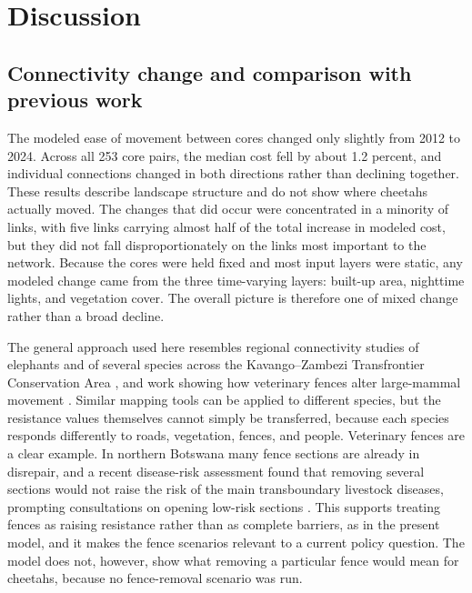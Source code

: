 \section{Discussion}
\label{sec:discussion}

\subsection{Connectivity change and comparison with previous work}

The modeled ease of movement between cores changed only slightly from 2012 to 2024. Across all 253 core pairs, the median cost fell by about 1.2 percent, and individual connections changed in both directions rather than declining together. These results describe landscape structure and do not show where cheetahs actually moved. The changes that did occur were concentrated in a minority of links, with five links carrying almost half of the total increase in modeled cost, but they did not fall disproportionately on the links most important to the network. Because the cores were held fixed and most input layers were static, any modeled change came from the three time-varying layers: built-up area, nighttime lights, and vegetation cover. The overall picture is therefore one of mixed change rather than a broad decline.

The general approach used here resembles regional connectivity studies of elephants and of several species across the Kavango--Zambezi Transfrontier Conservation Area \parencite{naidoo2024kaza,brennan2020multispecies}, and work showing how veterinary fences alter large-mammal movement \parencite{osipova2018fencing}. Similar mapping tools can be applied to different species, but the resistance values themselves cannot simply be transferred, because each species responds differently to roads, vegetation, fences, and people. Veterinary fences are a clear example. In northern Botswana many fence sections are already in disrepair, and a recent disease-risk assessment found that removing several sections would not raise the risk of the main transboundary livestock diseases, prompting consultations on opening low-risk sections \parencite{rosen2026fences}. This supports treating fences as raising resistance rather than as complete barriers, as in the present model, and it makes the fence scenarios relevant to a current policy question. The model does not, however, show what removing a particular fence would mean for cheetahs, because no fence-removal scenario was run.

